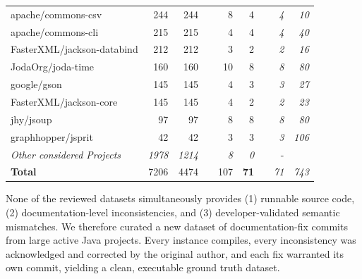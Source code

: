 \documentclass[acmsmall, screen]{acmart}
\begin{document}
\begin{table}[tb]
\begin{tabular}{@{}lrrcrrc@{\hskip 4pt}rr@{}}
{apache/commons-csv}               & {244}           & {244}           &           & {8}                  & {4}                   &           & \textit{4} & \textit{10}               \\
{apache/commons-cli}               & {215}           & {215}           &           & {4}                  & {4}                   &           & \textit{4} & \textit{40}               \\
FasterXML/jackson-databind       & 212           & 212           &           & 3                  & 2                   &           & \textit{2} & \textit{16}               \\
{JodaOrg/joda-time}                & {160}           & {160}           &           & {10}                 & {8}                   &           & \textit{8} & \textit{80}               \\
{google/gson}                      & {145}           & {145}           &           & {4}                  & {3}                   &           & \textit{3} & \textit{27}               \\
{FasterXML/jackson-core}           & {145}           & {145}           &           & {4}                  & {2}                   &           & \textit{2} & \textit{23}               \\
{jhy/jsoup}                        & {97}            & {97}            &           & {8}                  & {8}                   &           & \textit{8} & \textit{80}               \\
graphhopper/jsprit               & 42            & 42            &           & 3                  & 3                   &           & \textit{3} & \textit{106}              \\
{\textit{Other considered Projects\footnotemark}} & {\textit{1978}} & {\textit{1214}} &  & {\textit{8}}         & {\textit{0}}          &  & {-}                           \\ \midrule
\textbf{Total}                   & 7206          & 4474          &           & 107                &\textbf{71}        &           & \textit{71} & \textit{743}             \\ \bottomrule
\end{tabular}
\end{table}
None of the reviewed datasets simultaneously provides (1) runnable source code, (2) documentation-level inconsistencies, and (3) developer-validated semantic mismatches. 
We therefore curated a new dataset of documentation-fix commits from large active Java projects. Every instance compiles, every inconsistency was acknowledged and corrected by the original author, and each fix warranted its own commit, yielding a clean, executable ground truth dataset.
\end{document}
